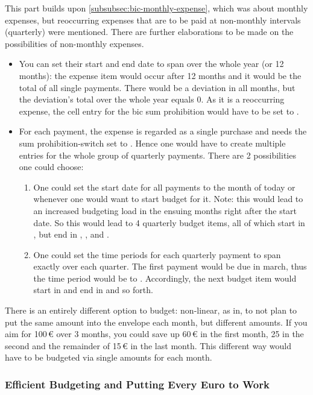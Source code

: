 This part builds upon \autoref{subsubsec:bic-monthly-expense}, which was about monthly expenses, but reoccurring expenses that are to be paid at non-monthly intervals (\eg quarterly) were mentioned.
There are further elaborations to be made on the possibilities of non-monthly expenses.
\begin{itemize}
	\item You can set their start and end date to span over the whole year (or 12 months): the expense item would occur after 12 months and it would be the total of all single payments.
	There would be a deviation in all months, but the deviation's total over the whole year equals 0.
	As it is a reoccurring expense, the cell entry for the \ac{bic} sum prohibition would have to be set to .
	\item For each payment, \ie the expense is regarded as a single purchase and needs the sum prohibition-switch set to .
	Hence one would have to create multiple entries for the whole group of quarterly payments.
	There are 2 possibilities one could choose:
	\begin{enumerate}
		\item One could set the start date for all payments to the month of today or whenever one would want to start budget for it.
		Note: this would lead to an increased budgeting load in the ensuing months right after the start date.
		So this would lead to 4 quarterly budget items, all of which start in , but end in , ,  and .
		\item One could set the time periods for each quarterly payment to span exactly over each quarter.
		The first payment would be due in march, thus the time period would be  to .
		Accordingly, the next budget item would start in  and end in  and so forth.
	\end{enumerate}
\end{itemize}

There is an entirely different option to budget: non-linear, as in, to not plan to put the same amount into the envelope each month, but different amounts.
If you aim for 100\,€ over 3 months, you could save up 60\,€ in the first month, 25 in the second and the remainder of 15\,€ in the last month.
This different way would have to be budgeted via single amounts for each month.

\subsubsection{Efficient Budgeting and Putting Every Euro to Work}
\label{subsubsec:efficient-budgeting}

